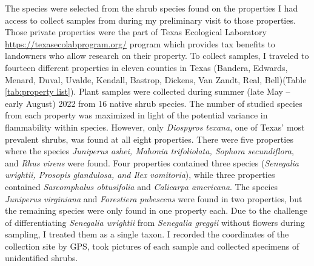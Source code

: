 \documentclass{ttuthes2007}
\begin{document}
The species were selected from the shrub species found on the properties I had access to collect samples from during my preliminary visit to those properties. Those private properties were the part of Texas Ecological Laboratory
\url{https://texasecolabprogram.org/} program which provides tax benefits to landowners who allow research on their property.  To collect samples, I traveled to fourteen different properties in eleven counties in Texas (Bandera, Edwards, Menard, Duval, Uvalde, Kendall, Bastrop, Dickens, Van Zandt, Real, Bell)(Table \ref{tab:property list}).   %
Plant samples were collected during summer (late May -- early August) 2022 from 16 native shrub species. The number of studied species from each property was maximized in light of the potential variance in flammability within species. However, only \emph{Diospyros texana}, one of Texas' most prevalent shrubs, was found at all eight properties. There were five properties where the species \emph{Juniperus ashei, Mahonia trifoliolata, Sophora secundiflora}, and \emph{Rhus virens} were found. Four properties contained three species (\emph{Senegalia wrightii, Prosopis glandulosa, and Ilex vomitoria}), while three properties contained \emph{Sarcomphalus obtusifolia} \citep{hauenschild2016phylogenetic} and \emph{Calicarpa americana}. The species \emph{Juniperus virginiana} and \emph{Forestiera pubescens} were found in two properties, but the remaining species were only found in one property each. %
 Due to the challenge of differentiating \emph{Senegalia wrightii} from \emph{Senegalia greggii} without flowers during sampling, I treated them as a single taxon. I recorded the coordinates of the collection site by GPS, took pictures of each sample  and collected specimens of unidentified shrubs.
\end{document}
